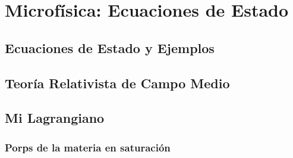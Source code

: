 \chapter{Microfísica: Ecuaciones de Estado}
\thispagestyle{fancy}


\section{Ecuaciones de Estado y Ejemplos}


\section{Teoría Relativista de Campo Medio}


\section{Mi Lagrangiano}


\subsection{Porps de la materia en saturación}

